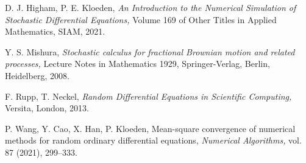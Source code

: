 \documentclass[reqno,12pt]{amsart}
\theoremstyle{plain}%
\theoremstyle{definition}
\begin{document}
\begin{thebibliography}{25}
     D. J. Higham, P. E. Kloeden, \emph{An Introduction to the Numerical Simulation of Stochastic Differential Equations,} Volume 169 of Other Titles in Applied Mathematics, SIAM, 2021.

     Y. S. Mishura, \emph{Stochastic calculus for fractional Brownian motion and related processes,} Lecture Notes in Mathematics 1929, Springer-Verlag, Berlin, Heidelberg, 2008.

     F. Rupp, T. Neckel, \emph{Random Differential Equations in Scientific Computing,} Versita, London, 2013.

     P. Wang, Y. Cao, X. Han, P. Kloeden, Mean-square convergence of numerical methods for random ordinary differential equations, \emph{Numerical Algorithms,} vol. 87 (2021), 299--333.

\end{thebibliography}
\end{document}
